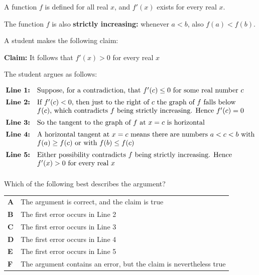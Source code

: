 \documentclass[11pt,a4paper]{article}
\begin{document}
\begin{enumerate}[label=\textbf{\arabic*.},leftmargin=*,itemsep=0pt,start=15]
A function $f$ is defined for all real $x$, and $f'(x)$ exists for every real $x$.

The function $f$ is also \textbf{strictly increasing:} whenever $a<b$, also $f(a)<f(b)$.

A student makes the following claim:
\begin{center}
\begin{minipage}{0.82\linewidth}
\centering
\textbf{Claim:} It follows that $f'(x)>0$ for every real $x$
\end{minipage}
\end{center}
The student argues as follows:

\[
\begin{array}{@{}rl@{}}
\textbf{Line 1:} & \text{Suppose, for a contradiction, that $f'(c)\le 0$ for some real number $c$} \\[5pt]
\textbf{Line 2:} & \text{If $f'(c)<0$, then just to the right of $c$ the graph of $f$ falls below} \\ 
& \text{$f(c)$, which contradicts $f$ being strictly increasing. Hence $f'(c)=0$} \\[5pt]
\textbf{Line 3:} & \text{So the tangent to the graph of $f$ at $x=c$ is horizontal} \\[5pt]
\textbf{Line 4:} & \text{A horizontal tangent at $x=c$ means there are numbers $a<c<b$ with} \\ 
& \text{$f(a)\ge f(c)$ or with $f(b)\le f(c)$} \\[5pt]
\textbf{Line 5:} & \text{Either possibility contradicts $f$ being strictly increasing. Hence} \\ 
& \text{$f'(x)>0$ for every real $x$} \\[5pt]
\end{array}
\]

Which of the following best describes the argument?

\par\vspace*{12pt}
\begin{tabularx}{\linewidth}{@{}>{\bfseries}l Y@{}}
A &
The argument is correct, and the claim is true
\\[0.8em]
B &
The first error occurs in Line 2
\\[0.8em]
C &
The first error occurs in Line 3
\\[0.8em]
D &
The first error occurs in Line 4
\\[0.8em]
E &
The first error occurs in Line 5
\\[0.8em]
F &
The argument contains an error, but the claim is nevertheless true
\\
\end{tabularx}


\end{enumerate}
\end{document}
